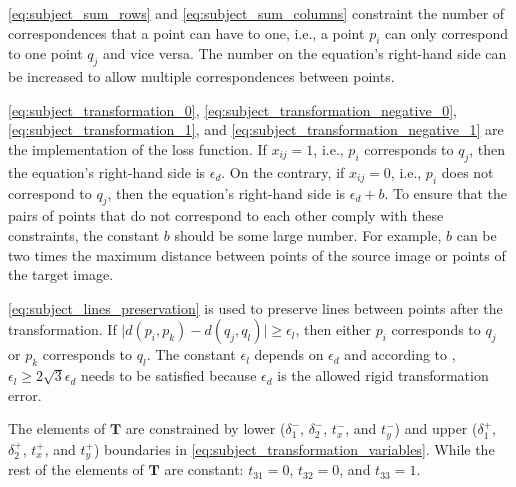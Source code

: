         \autoref{eq:subject_sum_rows} and \autoref{eq:subject_sum_columns} constraint the number of correspondences that a point can have to one,
        i.e., a point $p_i$ can only correspond to one point $q_j$ and vice versa. 
        The number on the equation’s right-hand side can be increased to allow multiple correspondences between points.

        \autoref{eq:subject_transformation_0}, \autoref{eq:subject_transformation_negative_0}, 
        \autoref{eq:subject_transformation_1}, and \autoref{eq:subject_transformation_negative_1} are the implementation of the loss function. 
        If $x_{ij} = 1$, i.e., $p_i$ corresponds to $q_j$, then the equation’s right-hand side is $\epsilon_d$. 
        On the contrary, if $x_{ij} = 0$, i.e., $p_i$ does not correspond to $q_j$, then the equation’s right-hand side is $\epsilon_d + b$.
        To ensure that the pairs of points that do not correspond to each other comply with these constraints, the constant $b$ should be some large number. 
        For example, $b$ can be two times the maximum distance between points of the source image or points of the target image. 

        \autoref{eq:subject_lines_preservation} is used to preserve lines between points after the transformation.
        If $\mid d(p_i, p_k) - d(q_j, q_l) \mid \geq \epsilon_l$, then either $p_i$ corresponds to $q_j$ or $p_k$ corresponds to $q_l$.
        The constant $\epsilon_l$ depends on $\epsilon_d$ and according to \cite{Sakakubara_2007_automatic}, 
        $\epsilon_l \geq 2 \sqrt{3} \epsilon_d$ needs to be satisfied because $\epsilon_d$ is the allowed rigid transformation error.

        The elements of $\pmb{T}$ are constrained by lower ($\delta_1^-$, $\delta_2^-$, $t_x^-$, and $t_y^-$)
        and upper ($\delta_1^+$, $\delta_2^+$, $t_x^+$, and $t_y^+$) boundaries
        in \autoref{eq:subject_transformation_variables}. 
        While the rest of the elements of $\pmb{T}$ are constant: $t_{31} = 0$, $t_{32} = 0$, and $t_{33} = 1$.
          


